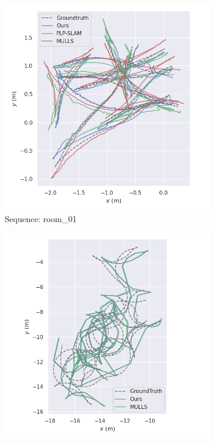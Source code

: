 \begin{figure}
  \centering
  \begin{subfigure}{0.24\linewidth}
    \centering
    \includegraphics[width=\linewidth]{images/room_01_trajectories.png}
    \caption{Sequence: room\_01}
    \label{fig:room_vs_base}
  \end{subfigure}
  \begin{subfigure}{0.24\linewidth}
    \centering
    \includegraphics[width=\linewidth]{images/hall_03_trajectories.png}

\end{subfigure}
\end{figure}
